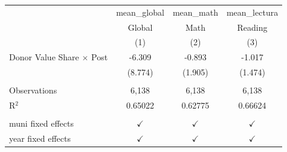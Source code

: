
\begingroup
\centering
\begin{tabular}{lccc}
   \toprule
                                    & mean\_global  & mean\_math    & mean\_lectura\\   
                                    & Global        & Math          & Reading \\   
                                    & (1)           & (2)           & (3)\\  
   \midrule 
   Donor Value Share $\times$ Post  & -6.309        & -0.893        & -1.017\\   
                                    & (8.774)       & (1.905)       & (1.474)\\   
    \\
   Observations                     & 6,138         & 6,138         & 6,138\\  
   R$^2$                            & 0.65022       & 0.62775       & 0.66624\\  
    \\
   muni fixed effects               & $\checkmark$  & $\checkmark$  & $\checkmark$\\   
   year fixed effects               & $\checkmark$  & $\checkmark$  & $\checkmark$\\   
   \bottomrule
\end{tabular}
\par\endgroup


